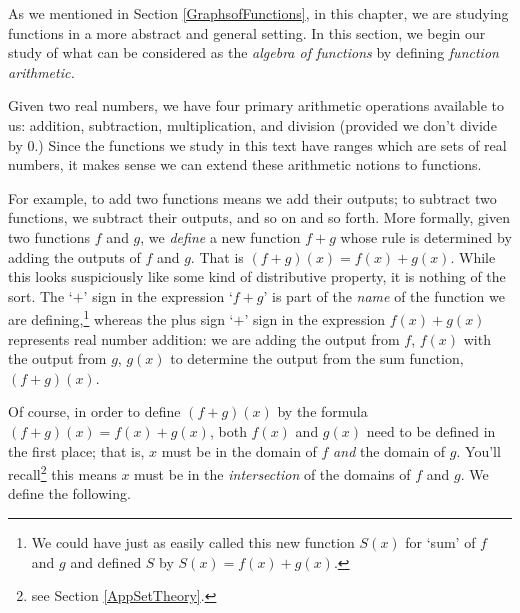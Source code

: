

\setcounter{footnote}{0}

\label{FunctionArithmetic}

As we mentioned in Section \ref{GraphsofFunctions}, in this chapter, we are studying functions in a more abstract and general setting.  In this section, we begin our study of what can be considered as the \textit{algebra of functions}  by defining \textit{function arithmetic.}  

\smallskip


Given two real numbers,  we have four primary arithmetic operations available to us:  addition, subtraction, multiplication, and division (provided we don't divide by $0$.)  Since the functions we study in this text have ranges which are sets of real numbers, it makes sense we can extend these arithmetic notions to functions. 

\smallskip

For example,  to add two functions means  we add their outputs;  to subtract two functions, we subtract their outputs, and so on and so forth.  More formally, given two functions $f$ and $g$, we \textit{define} a new function $f+g$ whose rule is determined by adding the outputs of $f$ and $g$.  That is $(f+g)(x) = f(x) + g(x)$.  While  this looks suspiciously like some kind of distributive property, it is nothing of the sort.  The `$+$' sign in the expression `$f+g$' is part of the \textit{name} of the function we are defining,\footnote{We could have just as easily called this new function $S(x)$ for `sum' of $f$ and $g$ and defined $S$ by $S(x) = f(x) + g(x)$.} whereas the plus sign `$+$' sign in the expression $f(x) + g(x)$ represents real number addition: we are adding the output from $f$, $f(x)$ with the output from $g$, $g(x)$ to determine the output from the sum function, $(f+g)(x)$.

\smallskip

 Of course, in order to define $(f+g)(x)$ by the formula $(f+g)(x) = f(x) + g(x)$, both $f(x)$ and $g(x)$ need to be defined in the first place; that is, $x$ must be in the domain of $f$ \textit{and} the domain of $g$.  You'll recall\footnote{see Section \ref{AppSetTheory}.} this means $x$ must be in the \textit{intersection} of the domains of $f$ and $g$.   We define the following.
 
 \smallskip

